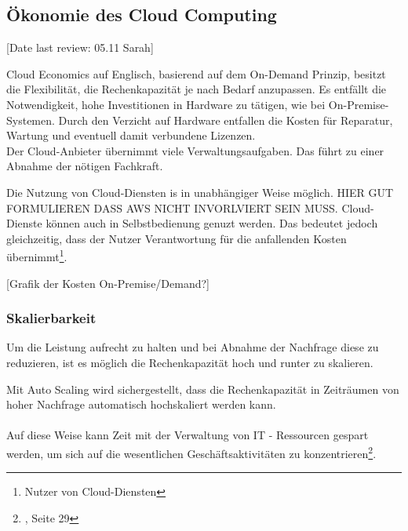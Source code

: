 \subsection{Ökonomie des Cloud Computing}\label{subsec_UabsGrund3}
[Date last review: 05.11 Sarah]
\begin{flushleft}
      
            Cloud Economics auf Englisch, basierend auf dem On-Demand Prinzip, besitzt die Flexibilität, die Rechenkapazität je nach Bedarf anzupassen.
            Es entfällt die Notwendigkeit, hohe Investitionen in Hardware zu tätigen, wie bei On-Premise-Systemen.
            Durch den Verzicht auf Hardware entfallen die Kosten für Reparatur, Wartung und eventuell damit verbundene Lizenzen. 
            \\
            Der Cloud-Anbieter übernimmt viele Verwaltungsaufgaben. Das führt zu einer Abnahme der nötigen Fachkraft.
            {\cite{IDC01}}

           Die Nutzung von Cloud-Diensten is in unabhängiger Weise möglich. 
           HIER GUT FORMULIEREN DASS AWS NICHT INVORLVIERT  SEIN MUSS.
           Cloud-Dienste können auch in Selbstbedienung genuzt werden. Das bedeutet jedoch gleichzeitig, dass der Nutzer Verantwortung für die anfallenden Kosten übernimmt\footnote{Nutzer von Cloud-Diensten}.
\end{flushleft}

[Grafik der Kosten On-Premise/Demand?]

\subsubsection{Skalierbarkeit}
Um die Leistung aufrecht zu halten und bei Abnahme der Nachfrage diese zu reduzieren,  ist es möglich die Rechenkapazität hoch und runter zu skalieren.

Mit Auto Scaling wird sichergestellt, dass die Rechenkapazität in Zeiträumen von hoher Nachfrage automatisch hochskaliert werden kann.
\\\\
Auf diese Weise kann Zeit mit der Verwaltung von IT - Ressourcen gespart werden, um sich auf die wesentlichen Geschäftsaktivitäten zu konzentrieren\footnote{{\cite{AWS1}}, Seite 29}.

